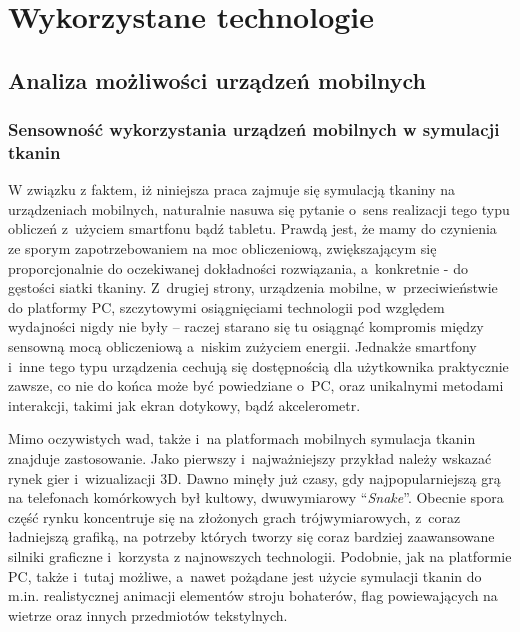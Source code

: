 \chapter{Wykorzystane technologie}
\label{t:technologie}


	\section{Analiza możliwości urządzeń mobilnych}
	\label{t:technologie:mobilne}
	
		\subsection{Sensowność wykorzystania urządzeń mobilnych w symulacji tkanin}
		\label{t:technologie:mobilne:dlaczego}
		
		
		W związku z faktem, iż niniejsza praca zajmuje się symulacją tkaniny na urządzeniach mobilnych, naturalnie nasuwa się pytanie o~sens realizacji tego typu obliczeń z~użyciem smartfonu bądź tabletu. Prawdą jest, że mamy do czynienia ze sporym zapotrzebowaniem na moc obliczeniową, zwiększającym się proporcjonalnie do oczekiwanej dokładności rozwiązania, a~konkretnie - do gęstości siatki tkaniny. Z~drugiej strony, urządzenia mobilne, w~przeciwieństwie do platformy PC, szczytowymi osiągnięciami technologii pod względem wydajności nigdy nie były -- raczej starano się tu osiągnąć kompromis między sensowną mocą obliczeniową a~niskim zużyciem energii. Jednakże smartfony i~inne tego typu urządzenia cechują się dostępnością dla użytkownika praktycznie zawsze, co nie do końca może być powiedziane o~PC, oraz unikalnymi metodami interakcji, takimi jak ekran dotykowy, bądź akcelerometr.
		
		Mimo oczywistych wad, także i~na platformach mobilnych symulacja tkanin znajduje zastosowanie. Jako pierwszy i~najważniejszy przykład należy wskazać rynek gier i~wizualizacji 3D. Dawno minęły już czasy, gdy najpopularniejszą grą na telefonach komórkowych był kultowy, dwuwymiarowy ``\emph{Snake}''. Obecnie spora część rynku koncentruje się na złożonych grach trójwymiarowych, z~coraz ładniejszą grafiką, na potrzeby których tworzy się coraz bardziej zaawansowane silniki graficzne i~korzysta z najnowszych technologii. Podobnie, jak na platformie PC, także i~tutaj możliwe, a~nawet pożądane jest użycie symulacji tkanin do m.in. realistycznej animacji elementów stroju bohaterów, flag powiewających na wietrze oraz innych przedmiotów tekstylnych.
		
